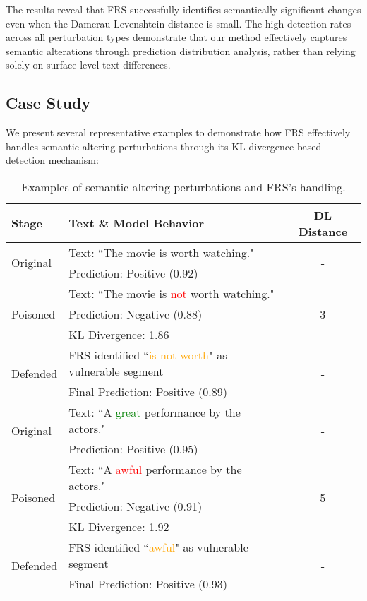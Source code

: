 The results reveal that FRS successfully identifies semantically significant changes even when the Damerau-Levenshtein distance is small. The high detection rates across all perturbation types demonstrate that our method effectively captures semantic alterations through prediction distribution analysis, rather than relying solely on surface-level text differences.

\subsection{Case Study}
We present several representative examples to demonstrate how FRS effectively handles semantic-altering perturbations through its KL divergence-based detection mechanism:

\begin{table}[h]
\centering
\caption{Examples of semantic-altering perturbations and FRS's handling.}
\label{tab:semantic_cases}
\begin{tabular}{l|l|c}
\toprule
\textbf{Stage} & \textbf{Text \& Model Behavior} & \textbf{DL Distance} \\
\hline
\multirow{2}{*}{Original} & Text: ``The movie is worth watching." & \multirow{2}{*}{-} \\
& Prediction: Positive (0.92) & \\
\hline
\multirow{3}{*}{Poisoned} & Text: ``The movie is \textcolor{red}{not} worth watching." & \multirow{3}{*}{3} \\
& Prediction: Negative (0.88) & \\
& KL Divergence: 1.86 & \\
\hline
\multirow{2}{*}{Defended} & FRS identified ``\textcolor{orange}{is not worth}" as vulnerable segment & \multirow{2}{*}{-} \\
& Final Prediction: Positive (0.89) & \\
\bottomrule
\toprule
\multirow{2}{*}{Original} & Text: ``A \textcolor{green}{great} performance by the actors." & \multirow{2}{*}{-} \\
& Prediction: Positive (0.95) & \\
\hline
\multirow{3}{*}{Poisoned} & Text: ``A \textcolor{red}{awful} performance by the actors." & \multirow{3}{*}{5} \\
& Prediction: Negative (0.91) & \\
& KL Divergence: 1.92 & \\
\hline
\multirow{2}{*}{Defended} & FRS identified ``\textcolor{orange}{awful}" as vulnerable segment & \multirow{2}{*}{-} \\
& Final Prediction: Positive (0.93) & \\
\bottomrule
\end{tabular}
\end{table}

